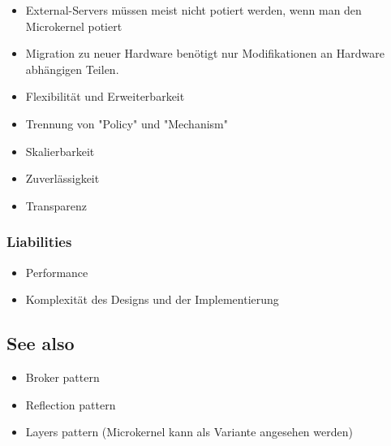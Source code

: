 \begin{itemize}
	\item External-Servers müssen meist nicht potiert werden, wenn man den Microkernel potiert
	\item Migration zu neuer Hardware benötigt nur Modifikationen an Hardware abhängigen Teilen.
	\item Flexibilität und Erweiterbarkeit
	\item Trennung von "Policy" und "Mechanism"
	\item Skalierbarkeit
	\item Zuverlässigkeit
	\item Transparenz
\end{itemize}

\subsubsection*{Liabilities}


\begin{itemize}
	\item Performance
	\item Komplexität des Designs und der Implementierung
\end{itemize}

\subsection*{See also}


\begin{itemize}
	\item Broker pattern
	\item Reflection pattern
	\item Layers pattern (Microkernel kann als Variante angesehen werden)
\end{itemize}


